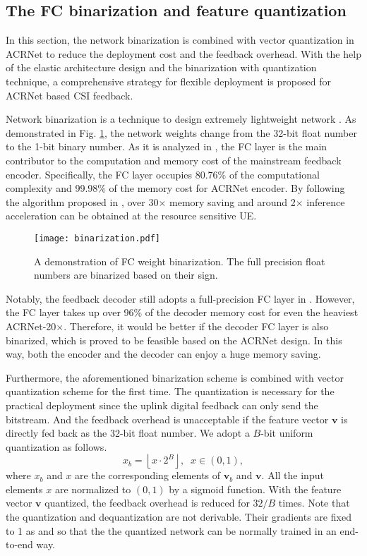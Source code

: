 \documentclass[12pt, draftclsnofoot, onecolumn]{IEEEtran}
\begin{document}
\subsection{The FC binarization and feature quantization} \label{Section4-2}

In this section, the network binarization is combined with vector quantization in ACRNet to reduce the deployment cost and the feedback overhead. With the help of the elastic architecture design and the binarization with quantization technique, a comprehensive strategy for flexible deployment is proposed for ACRNet based CSI feedback.

Network binarization is a technique to design extremely lightweight network \cite{rastegari2016xnor}. As demonstrated in Fig. \ref{FC Binarization}, the network weights change from the 32-bit float number to the 1-bit binary number. As it is analyzed in \cite{lu2021binary}, the FC layer is the main contributor to the computation and memory cost of the mainstream feedback encoder. Specifically, the FC layer occupies 80.76\% of the computational complexity and 99.98\% of the memory cost for ACRNet encoder. By following the algorithm proposed in \cite{lu2021binary}, over 30$\times$ memory saving and around 2$\times$ inference acceleration can be obtained at the resource sensitive UE.

\begin{figure}[!t]
\centering
\texttt{[image: binarization.pdf]}
\caption{A demonstration of FC weight binarization. The full precision float numbers are binarized based on their sign.}
\label{FC Binarization}
\end{figure}

Notably, the feedback decoder still adopts a full-precision FC layer in \cite{lu2021binary}. However, the FC layer takes up over 96\% of the decoder memory cost for even the heaviest ACRNet-20$\times$. Therefore, it would be better if the decoder FC layer is also binarized, which is proved to be feasible based on the ACRNet design. In this way, both the encoder and the decoder can enjoy a huge memory saving.

Furthermore, the aforementioned binarization scheme is combined with vector quantization scheme for the first time. The quantization is necessary for the practical deployment since the uplink digital feedback can only send the bitstream. And the feedback overhead is unacceptable if the feature vector $\mathbf{v}$ is directly fed back as the 32-bit float number. We adopt a $B$-bit uniform quantization as follows.
\begin{equation} \label{eq-quant}
    x_b = \left\lfloor x\cdot2^B \right\rfloor,\;\;x\in(0,1),
\end{equation}
where $x_b$ and $x$ are the corresponding elements of $\mathbf{v}_b$ and $\mathbf{v}$. All the input elements $x$ are normalized to $(0,1)$ by a sigmoid function. With the feature vector $\mathbf{v}$ quantized, the feedback overhead is reduced for $32/B$ times. Note that the quantization and dequantization are not derivable. Their gradients are fixed to 1 as \cite{lu2019bit} and \cite{guo2020convolutional} so that the the quantized network can be normally trained in an end-to-end way.
\end{document}
